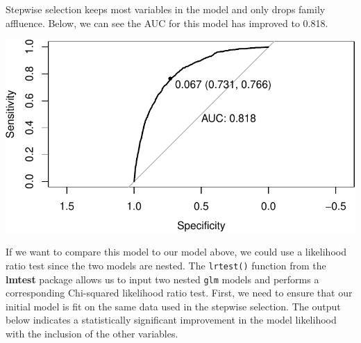 \documentclass[
  letterpaper,
]{krantz}
\makeatletter
\newenvironment{Shaded}{\begin{snugshade}}{\end{snugshade}}
\newcommand{\AttributeTok}[1]{\textcolor[rgb]{0.40,0.45,0.13}{#1}}
\newcommand{\ConstantTok}[1]{\textcolor[rgb]{0.56,0.35,0.01}{#1}}
\newcommand{\DecValTok}[1]{\textcolor[rgb]{0.68,0.00,0.00}{#1}}
\newcommand{\FunctionTok}[1]{\textcolor[rgb]{0.28,0.35,0.67}{#1}}
\newcommand{\NormalTok}[1]{\textcolor[rgb]{0.00,0.23,0.31}{#1}}
\newcommand{\OtherTok}[1]{\textcolor[rgb]{0.00,0.23,0.31}{#1}}
\newcommand{\SpecialCharTok}[1]{\textcolor[rgb]{0.37,0.37,0.37}{#1}}
\newcommand{\StringTok}[1]{\textcolor[rgb]{0.13,0.47,0.30}{#1}}
\newenvironment{kframe}{%
\medskip{}
\setlength{\fboxsep}{.8em}
 \def\at@end@of@kframe{}%
 \ifinner\ifhmode%
  \def\at@end@of@kframe{\end{minipage}}%
  \begin{minipage}{\columnwidth}%
 \fi\fi%
 \def\FrameCommand##1{\hskip\@totalleftmargin \hskip-\fboxsep
 \colorbox{shadecolor}{##1}\hskip-\fboxsep
     \hskip-\linewidth \hskip-\@totalleftmargin \hskip\columnwidth}%
 \MakeFramed {\advance\hsize-\width
   \@totalleftmargin\z@ \linewidth\hsize
   \@setminipage}}%
 {\par\unskip\endMakeFramed%
 \at@end@of@kframe}
\renewenvironment{Shaded}{\begin{kframe}}{\end{kframe}}
\makeatother
\begin{document}
Stepwise selection keeps most variables in the model and only drops
family affluence. Below, we can see the AUC for this model has improved
to 0.818.

\begin{Shaded}
\end{Shaded}

\begin{center}
\includegraphics[width=1\textwidth,height=\textheight]{book/logistic_regression_files/figure-pdf/unnamed-chunk-21-1.pdf}
\end{center}

If we want to compare this model to our model above, we could use a
likelihood ratio test since the two models are nested. The
\texttt{lrtest()} function from the \textbf{lmtest} package allows us to
input two nested \texttt{glm} models and performs a corresponding
Chi-squared likelihood ratio test. First, we need to ensure that our
initial model is fit on the same data used in the stepwise selection.
The output below indicates a statistically significant improvement in
the model likelihood with the inclusion of the other variables.
\end{document}

